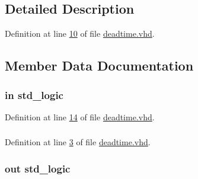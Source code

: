 \subsection{Detailed Description}


Definition at line \hyperlink{deadtime_8vhd_source_l00010}{10} of file \hyperlink{deadtime_8vhd_source}{deadtime.\+vhd}.



\subsection{Member Data Documentation}
\hypertarget{classdeadtime_ab5d0ea9e968d49d94da9db07a979d402}{}
\subsubsection[{C\+L\+K}]{ {\bfseries \textcolor{keywordflow}{in}\textcolor{vhdlchar}{ }} {\bfseries \textcolor{comment}{std\+\_\+logic}\textcolor{vhdlchar}{ }} \hspace{0.3cm}{\ttfamily [Port]}}\label{classdeadtime_ab5d0ea9e968d49d94da9db07a979d402}


Definition at line \hyperlink{deadtime_8vhd_source_l00014}{14} of file \hyperlink{deadtime_8vhd_source}{deadtime.\+vhd}.

\hypertarget{classdeadtime_a0a6af6eef40212dbaf130d57ce711256}{}
\subsubsection[{ieee}]{\hspace{0.3cm}{\ttfamily [Library]}}\label{classdeadtime_a0a6af6eef40212dbaf130d57ce711256}


Definition at line \hyperlink{deadtime_8vhd_source_l00003}{3} of file \hyperlink{deadtime_8vhd_source}{deadtime.\+vhd}.

\hypertarget{classdeadtime_a629edf1594d9c8b1a0844cd27222067a}{}
\subsubsection[{p\+\_\+\+Pwm1\+\_\+\+Out}]{ {\bfseries \textcolor{keywordflow}{out}\textcolor{vhdlchar}{ }} {\bfseries \textcolor{comment}{std\+\_\+logic}\textcolor{vhdlchar}{ }} \hspace{0.3cm}{\ttfamily [Port]}}\label{classdeadtime_a629edf1594d9c8b1a0844cd27222067a}


